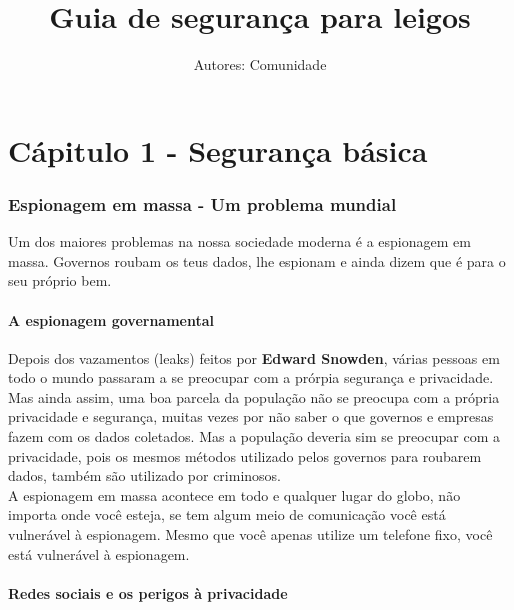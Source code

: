 \documentclass[12pt, letterpaper]{report}
\title{\Huge Guia de seguran\c{c}a para leigos} %
\author{Autores: Comunidade} %
\begin{document}
\maketitle %
\pagebreak %

\part{Cápitulo 1 - Segurança básica}

\section*{Espionagem em massa - Um problema mundial} %

\large Um dos maiores problemas na nossa sociedade moderna é a espionagem em massa. Governos roubam os teus dados, lhe espionam e ainda dizem que é para o seu próprio bem.\\

\subsection{A espionagem governamental}

	Depois dos vazamentos (leaks) feitos por \textbf{Edward Snowden}, várias pessoas em todo o mundo passaram a se preocupar com a prórpia segurança e privacidade. Mas ainda assim, uma boa parcela da população não se preocupa com a própria privacidade e segurança, muitas vezes por não saber o que governos e empresas fazem com os dados coletados. Mas a população deveria sim se  preocupar com a privacidade, pois os mesmos métodos utilizado pelos governos para roubarem dados, também são utilizado por criminosos.\\

	A espionagem em massa acontece em todo e qualquer lugar do globo, não importa onde você esteja, se tem algum meio de comunicação você está vulnerável à espionagem. Mesmo que você apenas utilize um telefone fixo, você está vulnerável à espionagem.\\

\subsection{Redes sociais e os perigos à privacidade}
\end{document}
